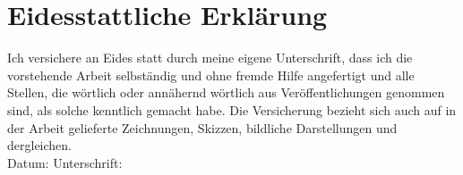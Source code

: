 \section*{Eidesstattliche Erklärung} 
\noindent
Ich versichere an Eides statt durch meine eigene Unterschrift, dass ich die vorstehende Arbeit selbständig und ohne fremde Hilfe angefertigt und alle Stellen, die wörtlich oder annähernd wörtlich aus Veröffentlichungen genommen sind, als solche kenntlich gemacht habe. Die Versicherung bezieht sich auch auf in der Arbeit gelieferte Zeichnungen, Skizzen, bildliche Darstellungen und dergleichen.\\[.1cm]

Datum: \hspace*{6cm} Unterschrift: